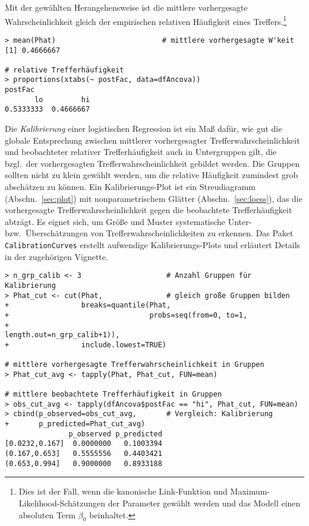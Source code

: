Mit der gewählten Herangehensweise ist die mittlere vorhergesagte Wahrscheinlichkeit gleich der empirischen relativen Häufigkeit eines Treffers.\footnote{Dies ist der Fall, wenn die kanonische Link-Funktion und Maximum-Likelihood-Schätzungen der Parameter gewählt werden und das Modell einen absoluten Term $\beta_{0}$ beinhaltet.}
\begin{lstlisting}
> mean(Phat)                         # mittlere vorhergesagte W'keit
[1] 0.4666667

# relative Trefferhäufigkeit
> proportions(xtabs(~ postFac, data=dfAncova))
postFac
       lo         hi
0.5333333  0.4666667
\end{lstlisting}

Die \emph{Kalibrierung} einer logistischen Regression ist ein Maß dafür, wie gut die globale Entsprechung zwischen mittlerer vorhergesagter Trefferwahrscheinlichkeit und beobachteter relativer Trefferhäufigkeit auch in Untergruppen gilt, die bzgl.\ der vorhergesagten Trefferwahrscheinlichkeit gebildet werden. Die Gruppen sollten nicht zu klein gewählt werden, um die relative Häufigkeit zumindest grob abschätzen zu können. Ein Kalibrierungs-Plot ist ein Streudiagramm (Abschn.\ \ref{sec:plot}) mit nonparametrischem Glätter (Abschn.\ \ref{sec:loess}), das die vorhergesagte Trefferwahrscheinlichkeit gegen die beobachtete Trefferhäufigkeit abträgt. Es eignet sich, um Größe und Muster systematische Unter- bzw.\ Überschätzungen von Trefferwahrscheinlichkeiten zu erkennen. Das Paket \lstinline!CalibrationCurves! \cite{DeCock2024} erstellt aufwendige Kalibrierungs-Plots und erläutert Details in der zugehörigen Vignette.
\begin{lstlisting}
> n_grp_calib <- 3                    # Anzahl Gruppen für Kalibrierung
> Phat_cut <- cut(Phat,               # gleich große Gruppen bilden
+                 breaks=quantile(Phat,
+                                 probs=seq(from=0, to=1,
+                                           length.out=n_grp_calib+1)),
+                 include.lowest=TRUE)

# mittlere vorhergesagte Trefferwahrscheinlichkeit in Gruppen
> Phat_cut_avg <- tapply(Phat, Phat_cut, FUN=mean)

# mittlere beobachtete Trefferhäufigkeit in Gruppen
> obs_cut_avg <- tapply(dfAncova$postFac == "hi", Phat_cut, FUN=mean)
> cbind(p_observed=obs_cut_avg,       # Vergleich: Kalibrierung
+       p_predicted=Phat_cut_avg)
               p_observed p_predicted
[0.0232,0.167]  0.0000000   0.1003394
(0.167,0.653]   0.5555556   0.4403421
(0.653,0.994]   0.9000000   0.8933188
\end{lstlisting}

